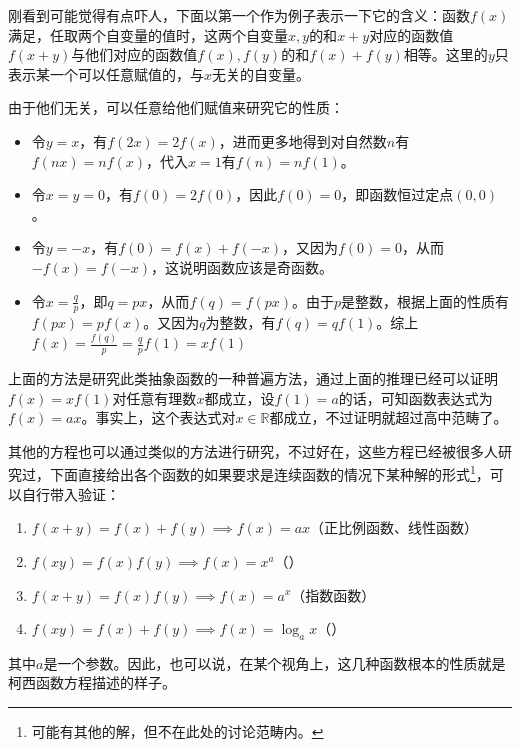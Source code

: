 刚看到可能觉得有点吓人，下面以第一个作为例子表示一下它的含义：函数$f(x)$满足，任取两个自变量的值时，这两个自变量$x,y$的和$x+y$对应的函数值$f(x+y)$与他们对应的函数值$f(x),f(y)$的和$f(x)+f(y)$相等。这里的$y$只表示某一个可以任意赋值的，与$x$无关的自变量。

由于他们无关，可以任意给他们赋值来研究它的性质：
\begin{itemize}
\item 令$y=x$，有$f(2x)=2f(x)$，进而更多地得到对自然数$n$有$f(nx)=nf(x)$，代入$x=1$有$f(n)=nf(1)$。
\item 令$x=y=0$，有$f(0)=2f(0)$，因此$f(0)=0$，即函数恒过定点$(0,0)$。
\item 令$y=-x$，有$f(0)=f(x)+f(-x)$，又因为$f(0)=0$，从而$-f(x)=f(-x)$，这说明函数应该是奇函数。
\item 令$\displaystyle x=\frac{q}{p}$，即$q=px$，从而$f(q)=f(px)$。由于$p$是整数，根据上面的性质有$f(px)=pf(x)$。又因为$q$为整数，有$f(q)=qf(1)$。综上$\displaystyle f(x)=\frac{f(q)}{p}=\frac{q}{p}f(1)=xf(1)$
\end{itemize}

上面的方法是研究此类抽象函数的一种普遍方法，通过上面的推理已经可以证明$f(x)=xf(1)$对任意有理数$x$都成立，设$f(1)=a$的话，可知函数表达式为$f(x)=ax$。事实上，这个表达式对$x\in\mathbb{R}$都成立，不过证明就超过高中范畴了。

其他的方程也可以通过类似的方法进行研究，不过好在，这些方程已经被很多人研究过，下面直接给出各个函数的如果要求是连续函数的情况下某种解的形式\footnote{可能有其他的解，但不在此处的讨论范畴内。}，可以自行带入验证：

\begin{enumerate}
\item $f(x+y)=f(x)+f(y)\implies f(x)=ax$（正比例函数、线性函数）
\item $f(xy)=f(x)f(y)\implies f(x)=x^a$（）
\item $f(x+y)=f(x)f(y)\implies f(x)=a^x$（指数函数）
\item $f(xy)=f(x)+f(y)\implies f(x)=\log_ax$（）
\end{enumerate}

其中$a$是一个参数。因此，也可以说，在某个视角上，这几种函数根本的性质就是柯西函数方程描述的样子。
